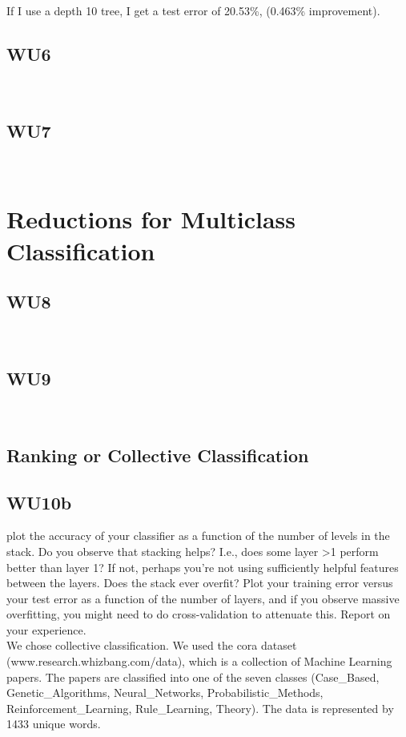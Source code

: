 \documentclass[a4paper,11pt]{article}
\begin{document}
If I use a depth 10 tree, I get a test error of 20.53\%, (0.463\%
improvement).

\subsection{WU6}
\textsf{}\\

\subsection{WU7}
\textsf{}\\

\section{Reductions for Multiclass Classification}
\subsection{WU8}
\textsf{}\\

\subsection{WU9}
\textsf{}\\

\subsection{Ranking or Collective Classification}
\subsection{WU10b}
\textsf{plot the accuracy of your classifier as a function
  of the number of levels in the stack. Do you observe that stacking
  helps? I.e., does some layer >1 perform better than layer 1? If not,
  perhaps you're not using sufficiently helpful features between the
  layers. Does the stack ever overfit? Plot your training error versus
  your test error as a function of the number of layers, and if you
  observe massive overfitting, you might need to do cross-validation
  to attenuate this. Report on your experience.}\\
We chose collective classification. We used the cora dataset
(www.research.whizbang.com/data), which is a collection of Machine
Learning papers. The papers are classified into one of the seven
classes (Case_Based, Genetic_Algorithms, Neural_Networks,
Probabilistic_Methods, Reinforcement_Learning, Rule_Learning, Theory). The data is represented by 1433 unique words.



      
\end{document}
